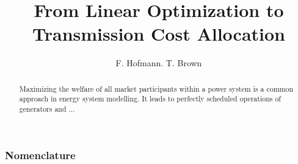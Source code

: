 \documentclass[11pt,twocolumn]{article}
\begin{document}
\title{From Linear Optimization to Transmission Cost Allocation}
\author{F. Hofmann. T. Brown}

\maketitle

\begin{abstract}
Maximizing the welfare of all market participants within a power system is a common approach in energy system modelling. It leads to perfectly scheduled operations of generators and ... 
\end{abstract}






\subsubsection*{Nomenclature}
\end{document}
